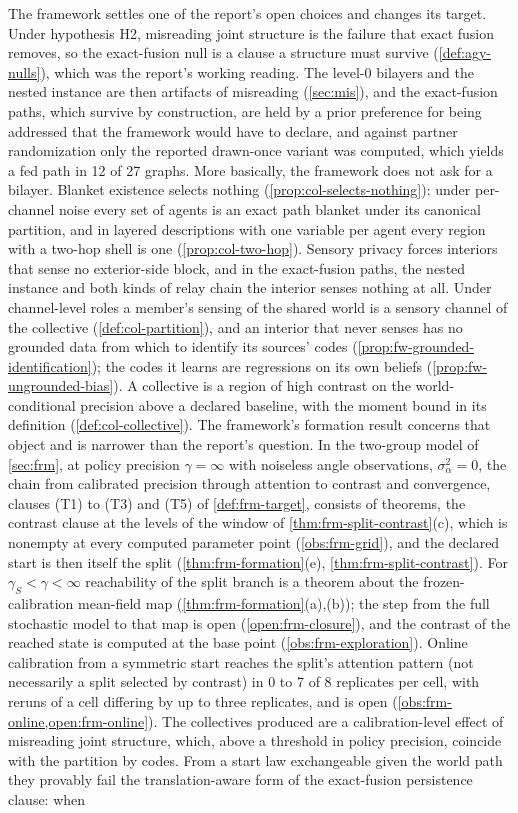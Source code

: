 The framework settles one of the report's open choices and changes its target. Under hypothesis H2, misreading joint structure is the failure that exact fusion removes, so the exact-fusion null is a clause a structure must survive (\cref{def:agy-nulls}), which was the report's working reading. The level-0 bilayers and the nested instance are then artifacts of misreading (\cref{sec:mis}), and the exact-fusion paths, which survive by construction, are held by a prior preference for being addressed that the framework would have to declare, and against partner randomization only the reported drawn-once variant was computed, which yields a fed path in 12 of 27 graphs. More basically, the framework does not ask for a bilayer. Blanket existence selects nothing (\cref{prop:col-selects-nothing}): under per-channel noise every set of agents is an exact path blanket under its canonical partition, and in layered descriptions with one variable per agent every region with a two-hop shell is one (\cref{prop:col-two-hop}). Sensory privacy forces interiors that sense no exterior-side block, and in the exact-fusion paths, the nested instance and both kinds of relay chain the interior senses nothing at all. Under channel-level roles a member's sensing of the shared world is a sensory channel of the collective (\cref{def:col-partition}), and an interior that never senses has no grounded data from which to identify its sources' codes (\cref{prop:fw-grounded-identification}); the codes it learns are regressions on its own beliefs (\cref{prop:fw-ungrounded-bias}). A collective is a region of high contrast on the world-conditional precision above a declared baseline, with the moment bound in its definition (\cref{def:col-collective}). The framework's formation result concerns that object and is narrower than the report's question. In the two-group model of \cref{sec:frm}, at policy precision $\gamma=\infty$ with noiseless angle observations, $\sigma_\alpha^2=0$, the chain from calibrated precision through attention to contrast and convergence, clauses (T1) to (T3) and (T5) of \cref{def:frm-target}, consists of theorems, the contrast clause at the levels of the window of \cref{thm:frm-split-contrast}(c), which is nonempty at every computed parameter point (\cref{obs:frm-grid}), and the declared start is then itself the split (\cref{thm:frm-formation}(e), \cref{thm:frm-split-contrast}). For $\gamma_S<\gamma<\infty$ reachability of the split branch is a theorem about the frozen-calibration mean-field map (\cref{thm:frm-formation}(a),(b)); the step from the full stochastic model to that map is open (\cref{open:frm-closure}), and the contrast of the reached state is computed at the base point (\cref{obs:frm-exploration}). Online calibration from a symmetric start reaches the split's attention pattern (not necessarily a split selected by contrast) in 0 to 7 of 8 replicates per cell, with reruns of a cell differing by up to three replicates, and is open (\cref{obs:frm-online,open:frm-online}). The collectives produced are a calibration-level effect of misreading joint structure, which, above a threshold in policy precision, coincide with the partition by codes. From a start law exchangeable given the world path they provably fail the translation-aware form of the exact-fusion persistence clause: when 